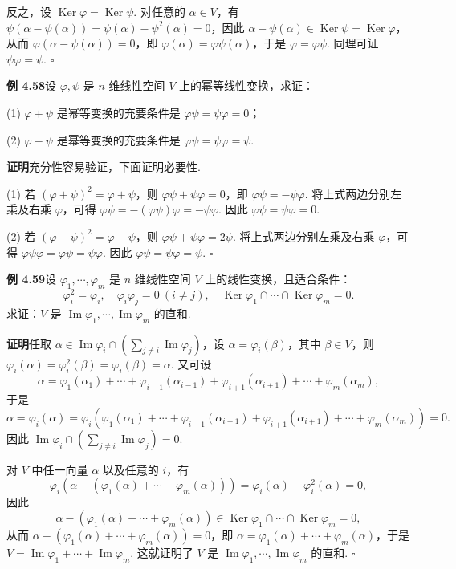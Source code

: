 \documentclass[UTF8,12pt,a4paper,fontset=fandol]{ctexart}
\begin{document}
反之，设 $\operatorname{Ker}\varphi=\operatorname{Ker}\psi$. 对任意的 $\alpha\in V$，有 $\psi(\alpha-\psi(\alpha))=\psi(\alpha)-\psi^2(\alpha)=0$，因此 $\alpha-\psi(\alpha)\in\operatorname{Ker}\psi=\operatorname{Ker}\varphi$，从而 $\varphi(\alpha-\psi(\alpha))=0$，即 $\varphi(\alpha)=\varphi\psi(\alpha)$，于是 $\varphi=\varphi\psi$. 同理可证 $\psi\varphi=\psi$. $\square$

\noindent\textbf{例 4.58}\quad 设 $\varphi,\psi$ 是 $n$ 维线性空间 $V$ 上的幂等线性变换，求证：

(1) $\varphi+\psi$ 是幂等变换的充要条件是 $\varphi\psi=\psi\varphi=0$；

(2) $\varphi-\psi$ 是幂等变换的充要条件是 $\varphi\psi=\psi\varphi=\psi$.

\noindent\textbf{证明}\quad 充分性容易验证，下面证明必要性.

(1) 若 $(\varphi+\psi)^2=\varphi+\psi$，则 $\varphi\psi+\psi\varphi=0$，即 $\varphi\psi=-\psi\varphi$. 将上式两边分别左乘及右乘 $\varphi$，可得 $\varphi\psi=-(\varphi\psi)\varphi=-\psi\varphi$. 因此 $\varphi\psi=\psi\varphi=0$.

(2) 若 $(\varphi-\psi)^2=\varphi-\psi$，则 $\varphi\psi+\psi\varphi=2\psi$. 将上式两边分别左乘及右乘 $\varphi$，可得 $\varphi\psi\varphi=\varphi\psi=\psi\varphi$. 因此 $\varphi\psi=\psi\varphi=\psi$. $\square$

\noindent\textbf{例 4.59}\quad 设 $\varphi_1,\cdots,\varphi_m$ 是 $n$ 维线性空间 $V$ 上的线性变换，且适合条件：
\[
\varphi_i^2=\varphi_i,\quad \varphi_i\varphi_j=0\ (i\ne j),\quad
\operatorname{Ker}\varphi_1\cap\cdots\cap\operatorname{Ker}\varphi_m=0.
\]
求证：$V$ 是 $\operatorname{Im}\varphi_1,\cdots,\operatorname{Im}\varphi_m$ 的直和.

\noindent\textbf{证明}\quad 任取 $\alpha\in\operatorname{Im}\varphi_i\cap\left(\sum_{j\ne i}\operatorname{Im}\varphi_j\right)$，设 $\alpha=\varphi_i(\beta)$，其中 $\beta\in V$，则 $\varphi_i(\alpha)=\varphi_i^2(\beta)=\varphi_i(\beta)=\alpha$. 又可设
\[
\alpha=\varphi_1(\alpha_1)+\cdots+\varphi_{i-1}(\alpha_{i-1})+\varphi_{i+1}(\alpha_{i+1})+\cdots+\varphi_m(\alpha_m),
\]
于是
\[
\alpha=\varphi_i(\alpha)=\varphi_i(\varphi_1(\alpha_1)+\cdots+\varphi_{i-1}(\alpha_{i-1})+\varphi_{i+1}(\alpha_{i+1})+\cdots+\varphi_m(\alpha_m))=0.
\]
因此 $\operatorname{Im}\varphi_i\cap\left(\sum_{j\ne i}\operatorname{Im}\varphi_j\right)=0$.

对 $V$ 中任一向量 $\alpha$ 以及任意的 $i$，有
\[
\varphi_i(\alpha-(\varphi_1(\alpha)+\cdots+\varphi_m(\alpha)))=\varphi_i(\alpha)-\varphi_i^2(\alpha)=0,
\]
因此
\[
\alpha-(\varphi_1(\alpha)+\cdots+\varphi_m(\alpha))\in\operatorname{Ker}\varphi_1\cap\cdots\cap\operatorname{Ker}\varphi_m=0,
\]
从而 $\alpha-(\varphi_1(\alpha)+\cdots+\varphi_m(\alpha))=0$，即 $\alpha=\varphi_1(\alpha)+\cdots+\varphi_m(\alpha)$，于是 $V=\operatorname{Im}\varphi_1+\cdots+\operatorname{Im}\varphi_m$. 这就证明了 $V$ 是 $\operatorname{Im}\varphi_1,\cdots,\operatorname{Im}\varphi_m$ 的直和. $\square$
\end{document}
